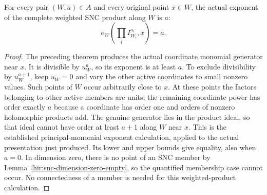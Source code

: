 \begin{theorem}
\label{hir:component-product-original-exponent}
\leanok
For every pair $(W,a)\in A$ and every original point $x\in W$, the
actual exponent of the complete weighted SNC product along $W$ is $a$:
\[
 e_W\left(\prod_i I_{W_i}^{a_i},x\right)=a.
\]
\end{theorem}
\begin{proof}
The preceding theorem produces the actual coordinate monomial generator
near $x$.  It is divisible by $u_W^a$, so its exponent is at least $a$.
To exclude divisibility by $u_W^{a+1}$, keep $u_W=0$ and vary the other
active coordinates to small nonzero values.  Such points of $W$ occur
arbitrarily close to $x$.  At these points the factors belonging to
other active members are units; the remaining coordinate power has
order exactly $a$ because a coordinate has order one and orders of
nonzero holomorphic products add.  The genuine generator lies in the
product ideal, so that ideal cannot have order at least $a+1$ along
$W$ near $x$.
This is the established principal-monomial exponent calculation,
applied to the actual presentation just produced.  Its lower and upper
bounds give equality, also when $a=0$.
In dimension zero, there is no point of an SNC member by
Lemma~\ref{hir:snc-dimension-zero-empty}, so the quantified membership
case cannot occur.  No connectedness of a member is needed for this
weighted-product calculation.
\end{proof}

